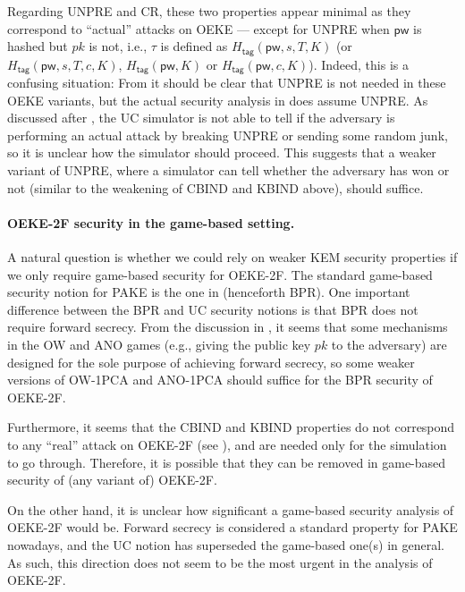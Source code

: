 \documentclass{article}
\theoremstyle{plain}
\theoremstyle{definition}
\theoremstyle{remark}
\newcommand{\Htag}{H_\mathsf{tag}}
\newcommand{\pw}{\mathsf{pw}}
\begin{document}
Regarding UNPRE and CR, these two properties appear minimal as they correspond to ``actual'' attacks on OEKE --- except for UNPRE when $\pw$ is hashed but $pk$ is not, i.e., $\tau$ is defined as $\Htag(\pw,s,T,K)$ (or $\Htag(\pw,s,T,c,K)$, $\Htag(\pw,K)$ or $\Htag(\pw,c,K)$). Indeed, this is a confusing situation: From  it should be clear that UNPRE is not needed in these OEKE variants, but the actual security analysis in  does assume UNPRE. As discussed after , the UC simulator is not able to tell if the adversary is performing an actual attack by breaking UNPRE or sending some random junk, so it is unclear how the simulator should proceed. This suggests that a weaker variant of UNPRE, where a simulator can tell whether the adversary has won or not (similar to the weakening of CBIND and KBIND above), should suffice.

\paragraph{OEKE-2F security in the game-based setting.}
A natural question is whether we could rely on weaker KEM security properties if we only require game-based security for OEKE-2F. The standard game-based security notion for PAKE is the one in \cite{EC:BelPoiRog00} (henceforth BPR). One important difference between the BPR and UC security notions is that BPR does not require forward secrecy. From the discussion in , it seems that some mechanisms in the OW and ANO games (e.g., giving the public key $pk$ to the adversary) are designed for the sole purpose of achieving forward secrecy, so some weaker versions of OW-1PCA and ANO-1PCA should suffice for the BPR security of OEKE-2F.

Furthermore, it seems that the CBIND and KBIND properties do not correspond to any ``real'' attack on OEKE-2F (see ), and are needed only for the simulation to go through. Therefore, it is possible that they can be removed in game-based security of (any variant of) OEKE-2F.

On the other hand, it is unclear how significant a game-based security analysis of OEKE-2F would be. Forward secrecy is considered a standard property for PAKE nowadays, and the UC notion has superseded the game-based one(s) in general. As such, this direction does not seem to be the most urgent in the analysis of OEKE-2F.
\end{document}
